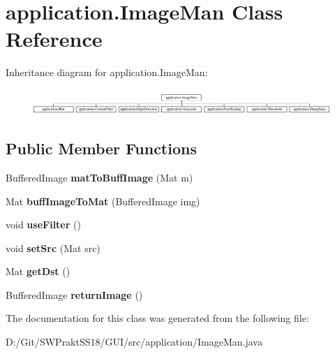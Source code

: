 \hypertarget{classapplication_1_1_image_man}{}\section{application.\+Image\+Man Class Reference}
\label{classapplication_1_1_image_man}
Inheritance diagram for application.\+Image\+Man\+:\begin{figure}[H]
\begin{center}
\leavevmode
\includegraphics[height=0.958084cm]{classapplication_1_1_image_man}
\end{center}
\end{figure}
\subsection*{Public Member Functions}
\begin{DoxyCompactItemize}
\item 
\mbox{\label{classapplication_1_1_image_man_aae0baacc6ca5c01021d2045a6cd3b2c7}} 
Buffered\+Image {\bfseries mat\+To\+Buff\+Image} (Mat m)
\item 
\mbox{\label{classapplication_1_1_image_man_aaa60d625c007f0cd250b92359c396287}} 
Mat {\bfseries buff\+Image\+To\+Mat} (Buffered\+Image img)
\item 
\mbox{\label{classapplication_1_1_image_man_a531cf4d9331275f9a1404288b16ea15f}} 
void {\bfseries use\+Filter} ()
\item 
\mbox{\label{classapplication_1_1_image_man_a1b46d728be6df846e37b36aa1c2d18b1}} 
void {\bfseries set\+Src} (Mat src)
\item 
\mbox{\label{classapplication_1_1_image_man_ad2f0532092c2a29b19109a5bc75030f8}} 
Mat {\bfseries get\+Dst} ()
\item 
\mbox{\label{classapplication_1_1_image_man_add796580ad43724d16c4922541c0a591}} 
Buffered\+Image {\bfseries return\+Image} ()
\end{DoxyCompactItemize}


The documentation for this class was generated from the following file\+:\begin{DoxyCompactItemize}
\item 
D\+:/\+Git/\+S\+W\+Prakt\+S\+S18/\+G\+U\+I/src/application/Image\+Man.\+java\end{DoxyCompactItemize}
